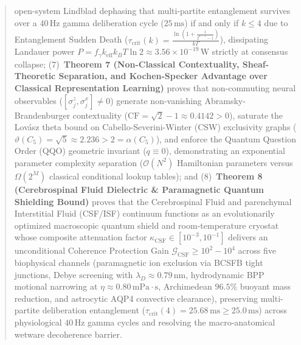 \documentclass[10pt,twocolumn,3p]{article}
\begin{document}
\begin{@twocolumnfalse}
\begin{abstract}
open-system Lindblad dephasing that multi-partite entanglement survives over a $40\,\text{Hz}$ gamma deliberation cycle ($25\,\text{ms}$) if and only if $k \le 4$ due to Entanglement Sudden Death ($\tau_{\text{crit}}(k) = \frac{\ln(1 + \frac{1}{2^{k-1}-1})}{k \Gamma}$), dissipating Landauer power $P = f_\gamma k_{\text{eff}} k_B T \ln 2 \approx 3.56 \times 10^{-19}\,\text{W}$ strictly at consensus collapse; (7)~\textbf{Theorem 7 (Non-Classical Contextuality, Sheaf-Theoretic Separation, and Kochen-Specker Advantage over Classical Representation Learning)} proves that non-commuting neural observables ($[\sigma_j^z, \sigma_j^x] \ne 0$) generate non-vanishing Abramsky-Brandenburger contextuality ($\text{CF} = \sqrt{2}-1 \approx 0.4142 > 0$), saturate the Lov\'asz theta bound on Cabello-Severini-Winter (CSW) exclusivity graphs ($\vartheta(C_5) = \sqrt{5} \approx 2.236 > 2 = \alpha(C_5)$), and enforce the Quantum Question Order (QQO) geometric invariant ($q \equiv 0$), demonstrating an exponential parameter complexity separation ($\mathcal{O}(N^2)$ Hamiltonian parameters versus $\Omega(2^M)$ classical conditional lookup tables); and (8)~\textbf{Theorem 8 (Cerebrospinal Fluid Dielectric \& Paramagnetic Quantum Shielding Bound)} proves that the Cerebrospinal Fluid and parenchymal Interstitial Fluid (CSF/ISF) continuum functions as an evolutionarily optimized macroscopic quantum shield and room-temperature cryostat whose composite attenuation factor $\kappa_{\text{CSF}} \in [10^{-3}, 10^{-1}]$ delivers an unconditional Coherence Protection Gain $\mathcal{G}_{\text{CSF}} \ge 10^2 - 10^4$ across five biophysical channels (paramagnetic ion exclusion via BCSFB tight junctions, Debye screening with $\lambda_D \approx 0.79\,\text{nm}$, hydrodynamic BPP motional narrowing at $\eta \approx 0.80\,\text{mPa}\cdot\text{s}$, Archimedean $96.5\%$ buoyant mass reduction, and astrocytic AQP4 convective clearance), preserving multi-partite deliberation entanglement ($\tau_{\text{crit}}(4) = 25.68\,\text{ms} \ge 25.0\,\text{ms}$) across physiological $40\,\text{Hz}$ gamma cycles and resolving the macro-anatomical wetware decoherence barrier.
    

\end{abstract}
\end{@twocolumnfalse}
\end{document}
